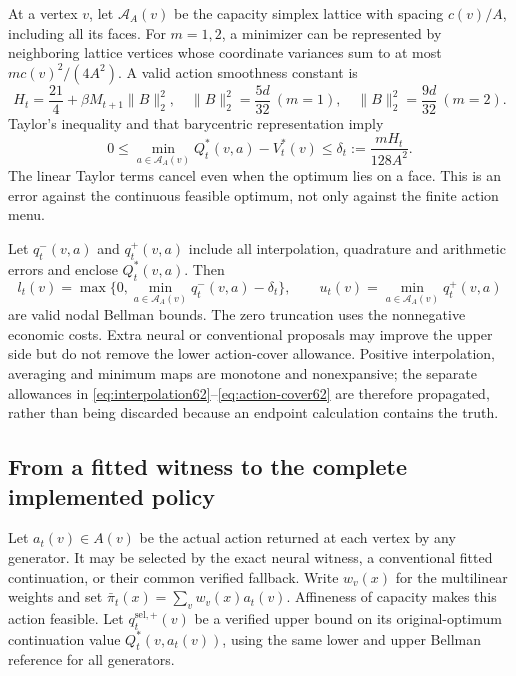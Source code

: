 At a vertex $v$, let $\mathcal A_A(v)$ be the capacity simplex lattice with spacing $c(v)/A$, including all its faces. For $m=1,2$, a minimizer can be represented by neighboring lattice vertices whose coordinate variances sum to at most $m c(v)^2/(4A^2)$. A valid action smoothness constant is
\[
 H_t=\frac{21}{4}+\beta M_{t+1}\|B\|_2^2,
 \quad \|B\|_2^2=\frac{5d}{32}\ (m=1),\quad
 \|B\|_2^2=\frac{9d}{32}\ (m=2).
\]
Taylor's inequality and that barycentric representation imply
\begin{equation}\label{eq:action-cover62}
 0\le\min_{a\in\mathcal A_A(v)}Q_t^*(v,a)-V_t^*(v)
       \le\delta_t:=\frac{mH_t}{128A^2}.
\end{equation}
The linear Taylor terms cancel even when the optimum lies on a face. This is an error against the continuous feasible optimum, not only against the finite action menu.

Let $q_t^-(v,a)$ and $q_t^+(v,a)$ include all interpolation, quadrature and arithmetic errors and enclose $Q_t^*(v,a)$. Then
\begin{equation}\label{eq:nodal62}
 l_t(v)=\max\{0,\min_{a\in\mathcal A_A(v)}q_t^-(v,a)-\delta_t\},
 \qquad
 u_t(v)=\min_{a\in\mathcal A_A(v)}q_t^+(v,a)
\end{equation}
are valid nodal Bellman bounds. The zero truncation uses the nonnegative economic costs. Extra neural or conventional proposals may improve the upper side but do not remove the lower action-cover allowance. Positive interpolation, averaging and minimum maps are monotone and nonexpansive; the separate allowances in \eqref{eq:interpolation62}--\eqref{eq:action-cover62} are therefore propagated, rather than being discarded because an endpoint calculation contains the truth.

\subsection{From a fitted witness to the complete implemented policy}
Let $a_t(v)\in A(v)$ be the actual action returned at each vertex by any generator. It may be selected by the exact neural witness, a conventional fitted continuation, or their common verified fallback. Write $w_v(x)$ for the multilinear weights and set $\bar\pi_t(x)=\sum_vw_v(x)a_t(v)$. Affineness of capacity makes this action feasible. Let $q_t^{\mathrm{sel},+}(v)$ be a verified upper bound on its original-optimum continuation value $Q_t^*(v,a_t(v))$, using the same lower and upper Bellman reference for all generators.

